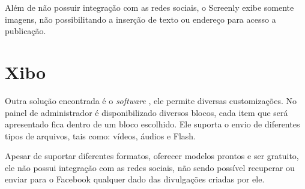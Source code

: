 Além de não possuir integração com as redes sociais, o Screenly exibe somente imagens, não possibilitando a inserção de texto ou endereço para acesso a publicação.

\section{Xibo}
Outra solução encontrada é o \textit{software} \citet{xibo2017}, ele permite diversas customizações. No painel de administrador é disponibilizado diversos blocos, cada item que será apresentado fica dentro de um bloco escolhido. Ele suporta o envio de diferentes tipos de arquivos, tais como: vídeos, áudios e Flash.

Apesar de suportar diferentes formatos, oferecer modelos prontos e ser gratuito, ele não possui integração com as redes sociais, não sendo possível recuperar ou enviar para o Facebook qualquer dado das divulgações criadas por ele. 

